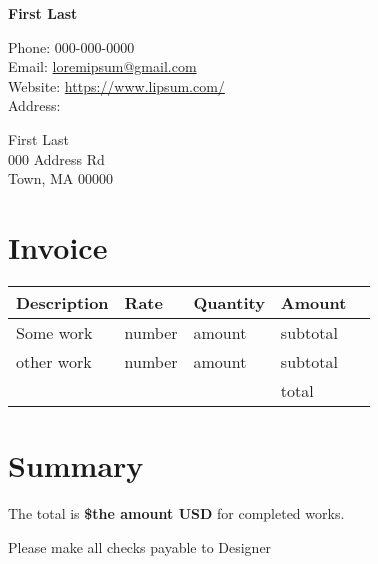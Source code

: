 \documentclass[12pt]{article} %
\begin{document}
{\LARGE\bfseries First Last} %

Phone: 000-000-0000\\ %
Email: \href{mailto:loremipsum@gmail.com}{loremipsum@gmail.com}\\ %
Website: \href{https://www.lipsum.com/}{https://www.lipsum.com/}\\ %
Address: \\

{\addtolength{\leftskip}{5mm}

First Last \\
000 Address Rd \\
Town, MA 00000}

\section*{Invoice}

\begin{table}[h]
\centering
\begin{tabular}{lllll}
Description                                  & Rate & Quantity & Amount &  \\ \hline
Some work                     & number    & amount       & subtotal     &  \\
other work  & number   & amount        & subtotal     &  \\ \cline{1-4}
                                             &      &          & total     & 
\end{tabular}
\end{table}


\section*{Summary}

The total is  \textbf{\$the amount USD} for completed works.

\bigskip
\bigskip
\noindent

Please make all checks payable to Designer
\end{document}

